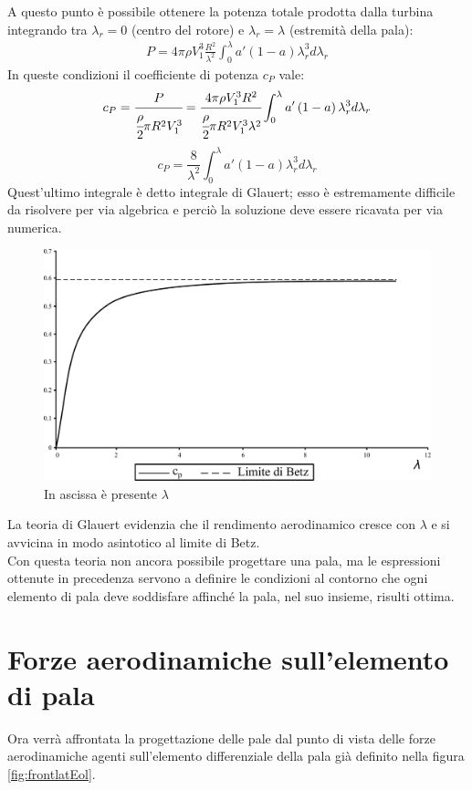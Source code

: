 A questo punto è possibile ottenere la potenza totale prodotta dalla turbina integrando tra $\lambda_r = 0$ (centro del rotore) e $\lambda_r = \lambda$ (estremità della pala):
\begin{align*}
P = 4 \pi \rho V_1^3 \frac{R^2}{\lambda^2} \int_0^{\lambda} a' \left( 1 - a \right) \lambda_r^3 d \lambda_r
\end{align*}
In queste condizioni il coefficiente di potenza $c_P$ vale:
\begin{align*}
c_P = \cfrac{P}{\cfrac{\rho}{2} \pi R^2 V_1^3} = \cfrac{4 \pi \rho V_1^3 R^2}{\cfrac{\rho}{2} \pi R^2  V_1^3 \lambda^2} \int_0^{\lambda} a' \left(1 - a \right) \lambda_r^3 d \lambda_r
\end{align*}
\begin{equation}
c_P = \frac{8}{\lambda^2} \int_0^{\lambda} a' \left( 1 - a \right) \lambda_r^3 d \lambda_r
\end{equation}
Quest'ultimo integrale è detto integrale di Glauert; esso è estremamente difficile da risolvere per via algebrica e perciò la soluzione deve essere ricavata per via numerica.
\begin{figure}[h!]
\centering
  \includegraphics[width=.7\textwidth]{fig/limBetz.pdf}
\caption{In ascissa è presente $\lambda$}
\label{fig:limBetz}
\end{figure}
La teoria di Glauert evidenzia che il rendimento aerodinamico cresce con $\lambda$ e si avvicina in modo asintotico al limite di Betz. \\
Con questa teoria non ancora possibile progettare una pala, ma le espressioni ottenute in precedenza servono a definire le condizioni al contorno che ogni elemento di pala deve soddisfare affinché la pala, nel suo insieme, risulti ottima.

\section{Forze aerodinamiche sull'elemento di pala}
Ora verrà affrontata la progettazione delle pale dal punto di vista delle forze aerodinamiche agenti sull'elemento differenziale della pala già definito nella figura \ref{fig:frontlatEol}. 

